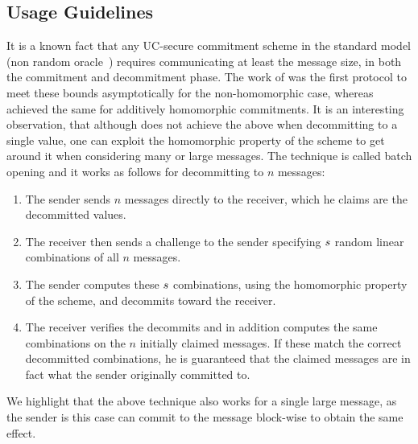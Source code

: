 
\subsection{Usage Guidelines}
It is a known fact that any UC-secure \cite{DBLP:conf/focs/Canetti01} commitment scheme in the standard model (non random oracle~\cite{DBLP:conf/ccs/BellareR93}) requires communicating at least the message size, in both the commitment and decommitment phase. The work of \cite{DBLP:conf/eurocrypt/GarayIKW14} was the first protocol to meet these bounds asymptotically for the non-homomorphic case, whereas \cite{DBLP:conf/tcc/FrederiksenJNT16} achieved the same for additively homomorphic commitments. It is an interesting observation, that although \cite{DBLP:conf/tcc/FrederiksenJNT16} does not achieve the above when decommitting to a single value, one can exploit the homomorphic property of the scheme to get around it when considering many or large messages. The technique is called batch opening and it works as follows for decommitting to $n$ messages:
\begin{enumerate}
  \item The sender sends $n$ messages directly to the receiver, which he claims are the decommitted values.
  \item The receiver then sends a challenge to the sender specifying $s$ random linear combinations of all $n$ messages.
  \item The sender computes these $s$ combinations, using the homomorphic property of the scheme, and decommits toward the receiver.
  \item The receiver verifies the decommits and in addition computes the same combinations on the $n$ initially claimed messages. If these match the correct decommitted combinations, he is guaranteed that the claimed messages are in fact what the sender originally committed to.
\end{enumerate}

We highlight that the above technique also works for a single large message, as the sender is this case can commit to the message block-wise to obtain the same effect.

